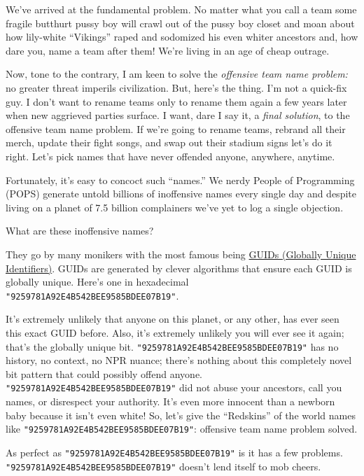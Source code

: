 We've arrived at the fundamental problem. No matter what you call a team
some fragile butthurt pussy boy will crawl out of the pussy boy closet
and moan about how lily-white ``Vikings'' raped and sodomized his even
whiter ancestors and, how dare you, name a team after them! We're living
in an age of cheap outrage.

Now, tone to the contrary, I am keen to solve the \emph{offensive team
name problem:} no greater threat imperils civilization. But, here's the
thing. I'm not a quick-fix guy. I don't want to rename teams only to
rename them again a few years later when new aggrieved parties surface.
I want, dare I say it, a \emph{final solution}, to the offensive team
name problem. If we're going to rename teams, rebrand all their merch,
update their fight songs, and swap out their stadium signs let's do it
right. Let's pick names that have never offended anyone, anywhere,
anytime.

Fortunately, it's easy to concoct such ``names.'' We nerdy People of
Programming (POPS) generate untold billions of inoffensive names every
single day and despite living on a planet of 7.5 billion complainers
we've yet to log a single objection.

What are these inoffensive names?

They go by many monikers with the most famous being
\href{https://www.uuidtools.com/what-is-uuid}{GUIDs (Globally Unique
Identifiers)}. GUIDs are generated by clever algorithms that ensure each
GUID is globally unique. Here's one in hexadecimal
\texttt{"9259781A92E4B542BEE9585BDEE07B19"}.

It's extremely unlikely that anyone on this planet, or any other, has
ever seen this exact GUID before. Also, it's extremely unlikely you will
ever see it again; that's the globally unique bit.
\texttt{"9259781A92E4B542BEE9585BDEE07B19"} has no history, no context, no NPR
nuance; there's nothing about this completely novel bit pattern that
could possibly offend anyone. \texttt{"9259781A92E4B542BEE9585BDEE07B19"} did not
abuse your ancestors, call you names, or disrespect your authority. It's
even more innocent than a newborn baby because it isn't even white! So,
let's give the ``Redskins'' of the world names like
\texttt{"9259781A92E4B542BEE9585BDEE07B19"}: offensive team name problem solved.

As perfect as \texttt{"9259781A92E4B542BEE9585BDEE07B19"} is it has a few
problems. \texttt{"9259781A92E4B542BEE9585BDEE07B19"} doesn't lend itself to mob
cheers.

